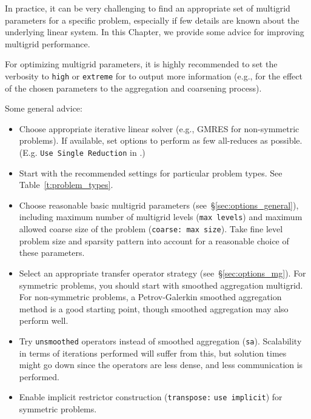 In practice, it can be very challenging to find an appropriate set of multigrid
parameters for a specific problem, especially if few details are known about the
underlying linear system. In this Chapter, we provide some advice for improving
multigrid performance.

\begin{mycomment}
For optimizing multigrid parameters, it is highly recommended to set the
verbosity to \verb|high| or \verb|extreme| for \muelu{} to output more
information (e.g., for the effect of the chosen parameters to the aggregation
and coarsening process).
\end{mycomment}

Some general advice:
\begin{itemize}
  \item
    Choose appropriate iterative linear solver (e.g., GMRES for non-symmetric problems).
    If available, set options to perform as few all-reduces as possible.
    (E.g. \texttt{Use Single Reduction} in \belos.)

  \item
    Start with the recommended settings for particular problem types. See
    Table~\ref{t:problem_types}.

  \item
    Choose reasonable basic multigrid parameters
    (see~\S\ref{sec:options_general}), including maximum number of multigrid
    levels (\texttt{max levels}) and maximum allowed coarse size of the problem
    (\texttt{coarse: max size}). Take fine level problem size and sparsity
    pattern into account for a reasonable choice of these parameters.

  \item
    Select an appropriate transfer operator strategy
    (see~\S\ref{sec:options_mg}). For symmetric problems, you should start with smoothed
    aggregation multigrid. For non-symmetric problems, a Petrov-Galerkin smoothed
    aggregation method is a good starting point, though smoothed aggregation may
    also perform well.

  \item
    Try \texttt{unsmoothed} operators instead of smoothed aggregation (\texttt{sa}).
    Scalability in terms of iterations performed will suffer from this,
    but solution times might go down since the operators are less dense,
    and less communication is performed.

  \item
    Enable implicit restrictor construction (\texttt{transpose:} \texttt{use implicit}) for symmetric
    problems.


\end{itemize}
